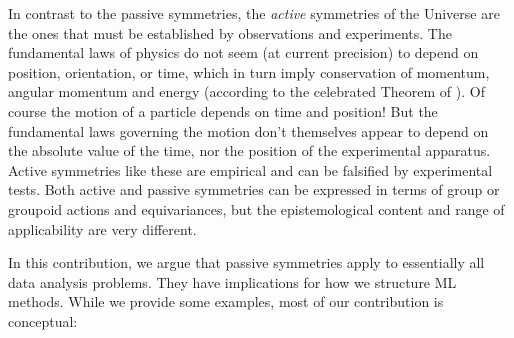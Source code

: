 \documentclass{article}
\theoremstyle{plain}
\theoremstyle{definition}
\theoremstyle{remark}
\begin{document}
In contrast to the passive symmetries, the {\em active} symmetries of the Universe are the ones that must be established by observations and experiments.
The fundamental laws of physics do not seem (at current precision) to depend on position, orientation, or time, which in turn imply conservation of momentum, angular momentum and energy (according to the celebrated Theorem of \citealt{noether}).
Of course the motion of a particle depends on time and position! But the fundamental laws governing the motion don't themselves appear to depend on the absolute value of the time, nor the position of the experimental apparatus.
Active symmetries like these are empirical and can be falsified by experimental tests.
Both active and passive symmetries can be expressed in terms of group or groupoid actions and equivariances, but the epistemological content and range of applicability are very different. 

In this contribution, we argue that passive symmetries apply to essentially all data analysis problems.
They have implications for how we structure ML methods. While we provide some examples, most of our contribution is conceptual:
\end{document}
